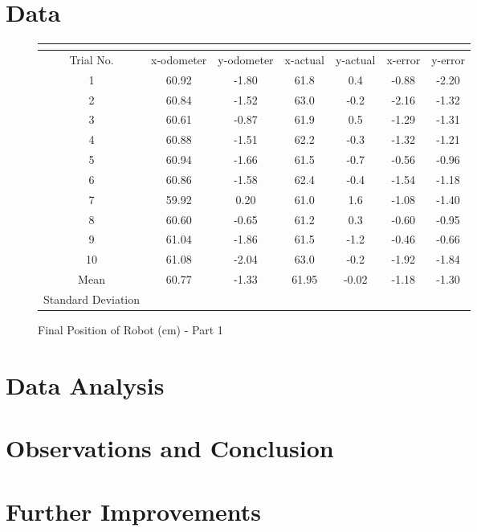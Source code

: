 \documentclass[11pt]{article}
\begin{document}
\section{Data}
\begin{figure}[h]
\begin{center}
\caption{Final Position of Robot (cm) - Part 1}
\begin{tabular}{| c | c | c | c | c | c | c |}
\multicolumn{4}{c}{} \\ \hline
Trial No. & x-odometer & y-odometer & x-actual & y-actual & x-error & y-error\\ \hline
1 & 60.92 & -1.80 & 61.8 & 0.4 & -0.88 & -2.20 \\ \hline
2 & 60.84 & -1.52 & 63.0 & -0.2 & -2.16 & -1.32 \\ \hline
3 & 60.61 & -0.87 & 61.9 & 0.5 & -1.29 & -1.31 \\ \hline
4 & 60.88 & -1.51 & 62.2 & -0.3 & -1.32 & -1.21 \\ \hline
5 & 60.94 & -1.66 & 61.5 & -0.7 & -0.56 & -0.96 \\ \hline
6 & 60.86 & -1.58 & 62.4 & -0.4 & -1.54 & -1.18 \\ \hline
7 & 59.92 & 0.20 & 61.0 & 1.6 & -1.08 & -1.40 \\ \hline
8 & 60.60 & -0.65 & 61.2 & 0.3 & -0.60 & -0.95 \\ \hline
9 & 61.04 & -1.86 & 61.5 & -1.2 & -0.46 & -0.66 \\ \hline
10 & 61.08 & -2.04 & 63.0 & -0.2 & -1.92 & -1.84 \\ \hline
Mean & 60.77 & -1.33 & 61.95 & -0.02 & -1.18 & -1.30 \\ \hline
Standard Deviation &  &  &  &  &  &  \\ \hline
\end{tabular}
\end{center}
\end{figure}
\section{Data Analysis}
\section{Observations and Conclusion}
\section{Further Improvements}
\end{document}
